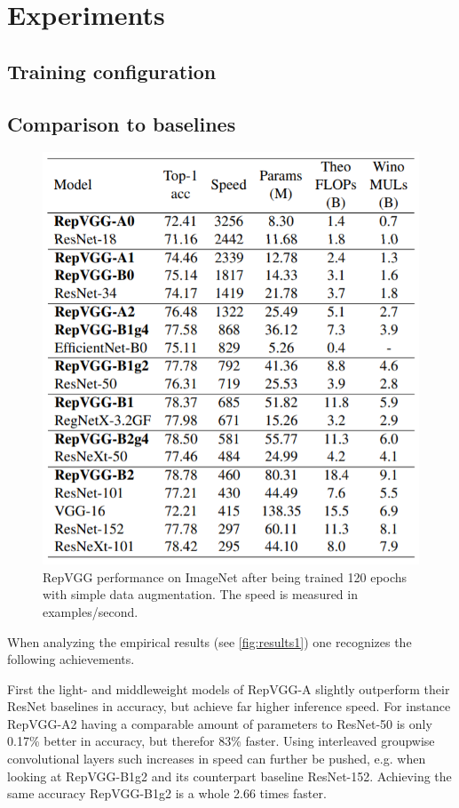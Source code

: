 \section{Experiments}

\subsection{Training configuration}

\subsection{Comparison to baselines}

\begin{figure}[t]
	\begin{center}
		\includegraphics[width=0.8\linewidth]{images/results1.PNG}
	\end{center}
	\caption{RepVGG performance on ImageNet after being trained 120 epochs with simple data augmentation. The speed is measured in examples/second.}
	\label{fig:results1}
\end{figure}

When analyzing the empirical results (see \autoref{fig:results1}) one recognizes the following achievements. 

First the light- and middleweight models of RepVGG-A slightly outperform their ResNet baselines in accuracy, but achieve far higher inference speed. For instance RepVGG-A2 having a comparable amount of parameters to ResNet-50 is only 0.17\% better in accuracy, but therefor 83\% faster. Using interleaved groupwise convolutional layers such increases in speed can further be pushed, e.g. when looking at RepVGG-B1g2 and its counterpart baseline ResNet-152. Achieving the same accuracy RepVGG-B1g2 is a whole 2.66 times faster. 

